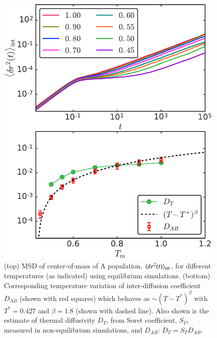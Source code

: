 \begin{figure}[hbt!]
    \centering
	\includegraphics[width=12cm]{figs/fig3p3.pdf}
	\caption[{\em Center of mass MSD and interdiffusion coefficient measurement}]{(top) MSD of center-of-mass of A population, $\langle\delta{r^2(t)}\rangle_{\rm int}$, for different temperatures (as indicated) using equilibrium simulations. (bottom) Corresponding temperature variation of inter-diffusion coefficient $D_{AB}$ (shown with red squares) which behaves as $\sim(T-T^*)^{\beta}$ with $T^*=0.427$ and $\beta=1.8$ (shown with dashed line). Also shown is the estimate of thermal diffusivity $D_T$, from Soret coefficient, $S_T$, measured in non-equilibrium simulations, and $D_{AB}$: $D_T=S_T{D_{AB}}$. \label{fig3p3}}
\end{figure}

